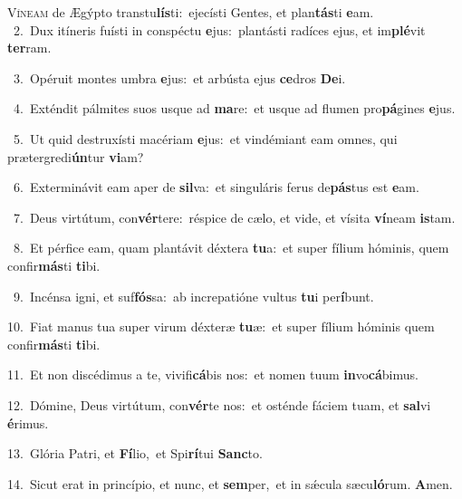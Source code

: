 \lettrine{\initial\textcolor{\initialcolor}{V}}{íneam} de Ægýpto transtu\-\textbf{lís}\-ti:~\star ejecísti Gentes, et plan\-\textbf{tás}\-ti \textbf{e}\-am.\\
{\numbfont\textcolor{\numbcolor}{~2.}}~Dux itíneris fuísti in conspéctu \textbf{e}\-jus:~\star plantásti radíces ejus, et im\-\textbf{plé}\-vit \textbf{ter}\-ram.\par
{\numbfont\textcolor{\numbcolor}{~3.}}~Opéruit montes umbra \textbf{e}\-jus:~\star et arbústa ejus \textbf{ce}\-dros \textbf{De}\-i.\par
{\numbfont\textcolor{\numbcolor}{~4.}}~Exténdit pálmites suos usque ad \textbf{ma}\-re:~\star et usque ad flumen pro\-\textbf{pá}\-gines \textbf{e}\-jus.\par
{\numbfont\textcolor{\numbcolor}{~5.}}~Ut quid destruxísti macériam \textbf{e}\-jus:~\star et vindémiant eam omnes, qui prætergredi\-\textbf{ún}\-tur \textbf{vi}\-am?\par
{\numbfont\textcolor{\numbcolor}{~6.}}~Exterminávit eam aper de \textbf{sil}\-va:~\star et singuláris ferus de\-\textbf{pás}\-tus est \textbf{e}\-am.\par
{\numbfont\textcolor{\numbcolor}{~7.}}~Deus virtútum, con\-\textbf{vér}\-tere:~\star réspice de cælo, et vide, et vísita \textbf{ví}\-neam \textbf{is}\-tam.\par
{\numbfont\textcolor{\numbcolor}{~8.}}~Et pérfice eam, quam plantávit déxtera \textbf{tu}\-a:~\star et super fílium hóminis, quem confir\-\textbf{más}\-ti \textbf{ti}\-bi.\par
{\numbfont\textcolor{\numbcolor}{~9.}}~Incénsa igni, et suf\-\textbf{fós}\-sa:~\star ab increpatióne vultus \textbf{tu}\-i per\-\textbf{í}\-bunt.\par
{\numbfont\textcolor{\numbcolor}{10.}}~Fiat manus tua super virum déxteræ \textbf{tu}\-æ:~\star et super fílium hóminis quem confir\-\textbf{más}\-ti \textbf{ti}\-bi.\par
{\numbfont\textcolor{\numbcolor}{11.}}~Et non discédimus a te, vivifi\-\textbf{cá}\-bis nos:~\star et nomen tuum \textbf{in}\-vo\-\textbf{cá}\-bimus.\par
{\numbfont\textcolor{\numbcolor}{12.}}~Dómine, Deus virtútum, con\-\textbf{vér}\-te nos:~\star et osténde fáciem tuam, et \textbf{sal}\-vi \textbf{é}\-rimus.\par
{\numbfont\textcolor{\numbcolor}{13.}}~Glória Patri, et \textbf{Fí}\-lio,~\star et Spi\-\textbf{rí}\-tui \textbf{Sanc}\-to.\par
{\numbfont\textcolor{\numbcolor}{14.}}~Sicut erat in princípio, et nunc, et \textbf{sem}\-per,~\star et in sǽcula sæcu\-\textbf{ló}\-rum. \textbf{A}\-men.\par
